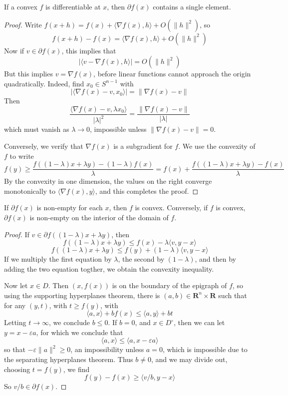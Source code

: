 \begin{theorem}
    If a convex $f$ is differentiable at $x$, then $\partial f(x)$ contains a single element.
\end{theorem}
\begin{proof}
    Write $f(x + h) = f(x) + \langle \nabla f(x), h \rangle + O(\|h\|^2)$, so
    \[ f(x + h) - f(x) = \langle \nabla f(x), h \rangle + O(\|h\|^2) \]
    Now if $v \in \partial f(x)$, this implies that
    \[ |\langle v - \nabla f(x), h \rangle| = O(\|h\|^2) \]
    But this implies $v = \nabla f(x)$, before linear functions cannot approach the origin quadratically. Indeed, find $x_0 \in S^{n-1}$ with
    \[ |\langle \nabla f(x) - v, x_0 \rangle| = \| \nabla f(x) - v \| \]
    Then
    \[ \frac{\langle \nabla f(x) - v, \lambda x_0 \rangle}{|\lambda|^2} = \frac{\| \nabla f(x) - v \|}{|\lambda|} \]
    which must vanish as $\lambda \to 0$, impossible unless $\| \nabla f(x) - v \| = 0$.

    Conversely, we verify that $\nabla f(x)$ is a subgradient for $f$. We use the convexity of $f$ to write
    \[ f(y) \geq \frac{f((1 - \lambda)x + \lambda y) - (1 - \lambda) f(x)}{\lambda} = f(x) + \frac{f((1 - \lambda)x + \lambda y) - f(x)}{\lambda} \]
    By the convexity in one dimension, the values on the right converge monotonically to $\langle \nabla f(x), y \rangle$, and this completes the proof.
\end{proof}

\begin{theorem}
    If $\partial f(x)$ is non-empty for each $x$, then $f$ is convex. Conversely, if $f$ is convex, $\partial f(x)$ is non-empty on the interior of the domain of $f$.
\end{theorem}
\begin{proof}
    If $v \in \partial f((1 - \lambda)x + \lambda y)$, then
    \[ f((1 - \lambda)x + \lambda y) \leq f(x) - \lambda \langle v, y - x \rangle \]
    \[ f((1 - \lambda)x + \lambda y) \leq f(y) + (1 - \lambda) \langle v, y - x \rangle \]
    If we multiply the first equation by $\lambda$, the second by $(1 - \lambda)$, and then by adding the two equation togther, we obtain the convexity inequality.

    Now let $x \in D$. Then $(x,f(x))$ is on the boundary of the epigraph of $f$, so using the supporting hyperplanes theorem, there is $(a,b) \in \mathbf{R}^n \times \mathbf{R}$ such that for any $(y, t)$, with $t \geq f(y)$, with
    \[ \langle a, x \rangle + b f(x) \leq \langle a, y \rangle + bt \]
    Letting $t \to \infty$, we conclude $b \leq 0$. If $b = 0$, and $x \in D^\circ$, then we can let $y = x - \varepsilon a$, for which we conclude that
    \[ \langle a, x \rangle \leq \langle a, x - \varepsilon a \rangle \]
    so that $- \varepsilon \| a \|^2 \geq 0$, an impossibility unless $a = 0$, which is impossible due to the separating hyperplanes theorem. Thus $b \neq 0$, and we may divide out, choosing $t = f(y)$, we find
    \[ f(y) - f(x) \geq \langle v/b, y - x \rangle \]
    So $v/b \in \partial f(x)$.
\end{proof}

